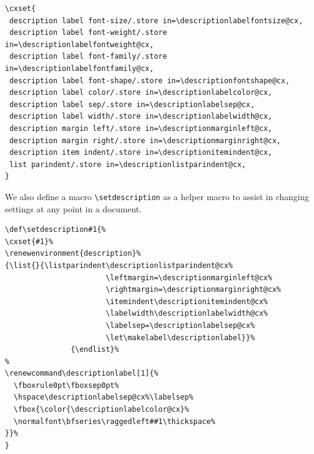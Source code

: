 \begin{tcolorbox}[title=Basic description list keys]
\begin{lstlisting}
\cxset{
 description label font-size/.store in=\descriptionlabelfontsize@cx,
 description label font-weight/.store in=\descriptionlabelfontweight@cx,
 description label font-family/.store in=\descriptionlabelfontfamily@cx,
 description label font-shape/.store in=\descriptionfontshape@cx,
 description label color/.store in=\descriptionlabelcolor@cx,
 description label sep/.store in=\descriptionlabelsep@cx,
 description label width/.store in=\descriptionlabelwidth@cx,
 description margin left/.store in=\descriptionmarginleft@cx,
 description margin right/.store in=\descriptionmarginright@cx,
 description item indent/.store in=\descriptionitemindent@cx,
 list parindent/.store in=\descriptionlistparindent@cx,
}
\end{lstlisting}
\end{tcolorbox}


We also define a macro \lstinline{\setdescription} as a helper macro to assist in changing settings at any point in a document.

\begin{tcolorbox}[title=Basic description list keys]
\begin{lstlisting}
\def\setdescription#1{%
\cxset{#1}%
\renewenvironment{description}%
{\list{}{\listparindent\descriptionlistparindent@cx%
                       \leftmargin=\descriptionmarginleft@cx%
                       \rightmargin=\descriptionmarginright@cx%
                       \itemindent\descriptionitemindent@cx%
                       \labelwidth\descriptionlabelwidth@cx%
                       \labelsep=\descriptionlabelsep@cx%
                       \let\makelabel\descriptionlabel}}%
               {\endlist}%
%
\renewcommand\descriptionlabel[1]{%
  \fboxrule0pt\fboxsep0pt%
  \hspace\descriptionlabelsep@cx%\labelsep%
  \fbox{\color{\descriptionlabelcolor@cx}%
  \normalfont\bfseries\raggedleft##1\thickspace%
}}%
}
\end{lstlisting}
\end{tcolorbox}


